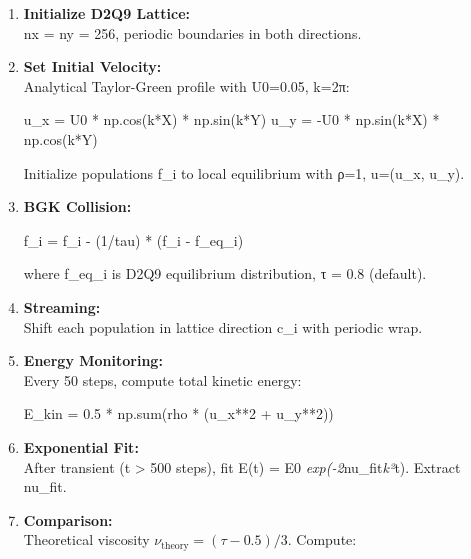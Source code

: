 \documentclass[
]{article}
\newenvironment{Shaded}{}{}
\newcommand{\BuiltInTok}[1]{\textcolor[rgb]{0.00,0.50,0.00}{#1}}
\newcommand{\DecValTok}[1]{\textcolor[rgb]{0.25,0.63,0.44}{#1}}
\newcommand{\FloatTok}[1]{\textcolor[rgb]{0.25,0.63,0.44}{#1}}
\newcommand{\NormalTok}[1]{#1}
\newcommand{\OperatorTok}[1]{\textcolor[rgb]{0.40,0.40,0.40}{#1}}
\begin{document}
\begin{enumerate}
\def\labelenumi{\arabic{enumi}.}
\item
  \textbf{Initialize D2Q9 Lattice:}\\
  nx = ny = 256, periodic boundaries in both directions.
\item
  \textbf{Set Initial Velocity:}\\
  Analytical Taylor-Green profile with U0=0.05, k=2π:

\begin{Shaded}
\begin{Highlighting}[]
\NormalTok{u\_x }\OperatorTok{=}\NormalTok{ U0 }\OperatorTok{*}\NormalTok{ np.cos(k}\OperatorTok{*}\NormalTok{X) }\OperatorTok{*}\NormalTok{ np.sin(k}\OperatorTok{*}\NormalTok{Y)}
\NormalTok{u\_y }\OperatorTok{=} \OperatorTok{{-}}\NormalTok{U0 }\OperatorTok{*}\NormalTok{ np.sin(k}\OperatorTok{*}\NormalTok{X) }\OperatorTok{*}\NormalTok{ np.cos(k}\OperatorTok{*}\NormalTok{Y)}
\end{Highlighting}
\end{Shaded}

  Initialize populations f\_i to local equilibrium with ρ=1, u=(u\_x,
  u\_y).
\item
  \textbf{BGK Collision:}

\begin{Shaded}
\begin{Highlighting}[]
\NormalTok{f\_i }\OperatorTok{=}\NormalTok{ f\_i }\OperatorTok{{-}}\NormalTok{ (}\DecValTok{1}\OperatorTok{/}\NormalTok{tau) }\OperatorTok{*}\NormalTok{ (f\_i }\OperatorTok{{-}}\NormalTok{ f\_eq\_i)}
\end{Highlighting}
\end{Shaded}

  where f\_eq\_i is D2Q9 equilibrium distribution, τ = 0.8 (default).
\item
  \textbf{Streaming:}\\
  Shift each population in lattice direction c\_i with periodic wrap.
\item
  \textbf{Energy Monitoring:}\\
  Every 50 steps, compute total kinetic energy:

\begin{Shaded}
\begin{Highlighting}[]
\NormalTok{E\_kin }\OperatorTok{=} \FloatTok{0.5} \OperatorTok{*}\NormalTok{ np.}\BuiltInTok{sum}\NormalTok{(rho }\OperatorTok{*}\NormalTok{ (u\_x}\OperatorTok{**}\DecValTok{2} \OperatorTok{+}\NormalTok{ u\_y}\OperatorTok{**}\DecValTok{2}\NormalTok{))}
\end{Highlighting}
\end{Shaded}
\item
  \textbf{Exponential Fit:}\\
  After transient (t \textgreater{} 500 steps), fit E(t) = E0
  \emph{exp(-2}nu\_fit\emph{k²}t). Extract nu\_fit.
\item
  \textbf{Comparison:}\\
  Theoretical viscosity \(\nu_{\text{theory}} = (\tau - 0.5)/3\).
  Compute:


\end{enumerate}
\end{document}
